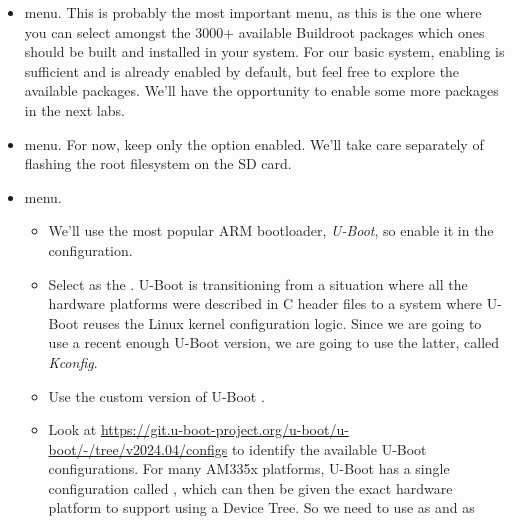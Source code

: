 \begin{itemize}
\begin{itemize}
  \item The kernel configuration for this platform requires having
    OpenSSL available on the host machine. To avoid depending on the
    OpenSSL development files installed by your host machine Linux
    distribution, Buildroot can build its own version: just enable the
     option.

  \end{itemize}

\item {} menu. This is probably the most important
  menu, as this is the one where you can select amongst the 3000+
  available Buildroot packages which ones should be built and
  installed in your system. For our basic system, enabling
   is sufficient and is already enabled by default, but
  feel free to explore the available packages. We'll have the
  opportunity to enable some more packages in the next labs.

\item {} menu. For now, keep only the  option enabled. We'll take care separately of
  flashing the root filesystem on the SD card.

\item {} menu.

  \begin{itemize}

  \item We'll use the most popular ARM bootloader, {\em U-Boot}, so
    enable it in the configuration.

  \item Select  as the . U-Boot is
    transitioning from a situation where all the hardware platforms
    were described in C header files to a system where U-Boot reuses
    the Linux kernel configuration logic. Since we are going to use a
    recent enough U-Boot version, we are going to use the latter,
    called {\em Kconfig}.

  \item Use the custom version of U-Boot .

  \item Look
    at \url{https://git.u-boot-project.org/u-boot/u-boot/-/tree/v2024.04/configs}
    to identify the available U-Boot configurations. For many AM335x
    platforms, U-Boot has a single configuration
    called , which can then be given the
    exact hardware platform to support using a Device Tree. So we need
    to use  as 
    and  as 


\end{itemize}
\end{itemize}
